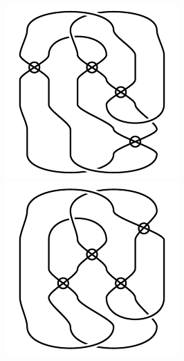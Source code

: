 \begin{figure}[H]
\begin{minipage}[b]{.18\linewidth}
\centering
\includegraphics[width=\linewidth]{../data/virtual_4_17.png}
\end{minipage}
\begin{minipage}[b]{.18\linewidth}
\centering
\includegraphics[width=\linewidth]{../data/virtual_4_18.png}

\end{minipage}
\end{figure}
